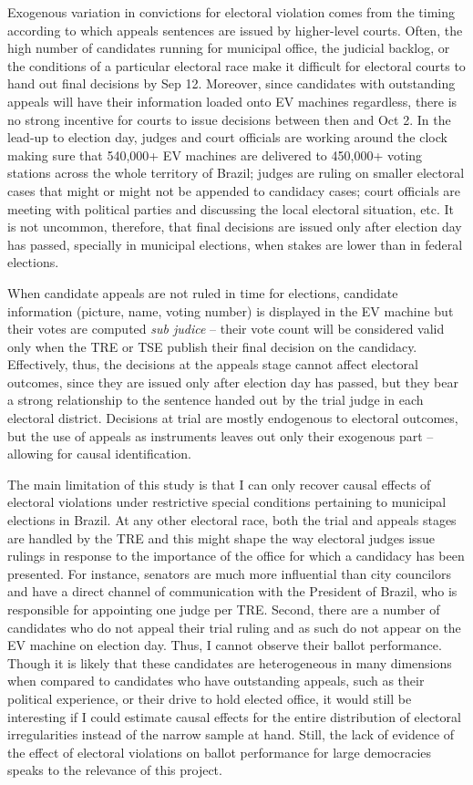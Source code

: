 \documentclass[11pt]{article}
\begin{document}
Exogenous variation in convictions for electoral violation comes from the timing according to which appeals sentences are issued by higher-level courts. Often, the high number of candidates running for municipal office, the judicial backlog, or the conditions of a particular electoral race make it difficult for electoral courts to hand out final decisions by Sep 12. Moreover, since candidates with outstanding appeals will have their information loaded onto EV machines regardless, there is no strong incentive for courts to issue decisions between then and Oct 2. In the lead-up to election day, judges and court officials are working around the clock making sure that 540,000+ EV machines are delivered to 450,000+ voting stations across the whole territory of Brazil; judges are ruling on smaller electoral cases that might or might not be appended to candidacy cases; court officials are meeting with political parties and discussing the local electoral situation, etc. It is not uncommon, therefore, that final decisions are issued only after election day has passed, specially in municipal elections, when stakes are lower than in federal elections.

When candidate appeals are not ruled in time for elections, candidate information (picture, name, voting number) is displayed in the EV machine but their votes are computed \emph{sub judice} -- their vote count will be considered valid only when the TRE or TSE publish their final decision on the candidacy. Effectively, thus, the decisions at the appeals stage cannot affect electoral outcomes, since they are issued only after election day has passed, but they bear a strong relationship to the sentence handed out by the trial judge in each electoral district. Decisions at trial are mostly endogenous to electoral outcomes, but the use of appeals as instruments leaves out only their exogenous part -- allowing for causal identification.

The main limitation of this study is that I can only recover causal effects of electoral violations under restrictive special conditions pertaining to municipal elections in Brazil. At any other electoral race, both the trial and appeals stages are handled by the TRE and this might shape the way electoral judges issue rulings in response to the importance of the office for which a candidacy has been presented. For instance, senators are much more influential than city councilors and have a direct channel of communication with the President of Brazil, who is responsible for appointing one judge per TRE. Second, there are a number of candidates who do not appeal their trial ruling and as such do not appear on the EV machine on election day. Thus, I cannot observe their ballot performance. Though it is likely that these candidates are heterogeneous in many dimensions when compared to candidates who have outstanding appeals, such as their political experience, or their drive to hold elected office, it would still be interesting if I could estimate causal effects for the entire distribution of electoral irregularities instead of the narrow sample at hand. Still, the lack of evidence of the effect of electoral violations on ballot performance for large democracies speaks to the relevance of this project.
\end{document}

